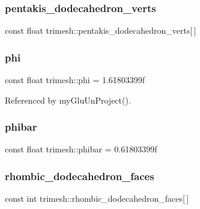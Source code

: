 \subsubsection{\texorpdfstring{pentakis\+\_\+dodecahedron\+\_\+verts}{pentakis\_dodecahedron\_verts}}
{\footnotesize\ttfamily const float trimesh\+::pentakis\+\_\+dodecahedron\+\_\+verts\mbox{[}$\,$\mbox{]}\hspace{0.3cm}{\ttfamily [static]}}

\mbox{\label{namespacetrimesh_ade4acd999d6155e3cf3d58ce8b0a30d8}} 
\subsubsection{\texorpdfstring{phi}{phi}}
{\footnotesize\ttfamily const float trimesh\+::phi = 1.\+61803399f\hspace{0.3cm}{\ttfamily [static]}}



Referenced by my\+Glu\+Un\+Project().

\mbox{\label{namespacetrimesh_a9ba8d304fcf63c306b2716fbdba7fe38}} 
\subsubsection{\texorpdfstring{phibar}{phibar}}
{\footnotesize\ttfamily const float trimesh\+::phibar = 0.\+61803399f\hspace{0.3cm}{\ttfamily [static]}}

\mbox{\label{namespacetrimesh_a7808199170e03948e6cc723a26835138}} 
\subsubsection{\texorpdfstring{rhombic\+\_\+dodecahedron\+\_\+faces}{rhombic\_dodecahedron\_faces}}
{\footnotesize\ttfamily const int trimesh\+::rhombic\+\_\+dodecahedron\+\_\+faces\mbox{[}$\,$\mbox{]}\hspace{0.3cm}{\ttfamily [static]}}

